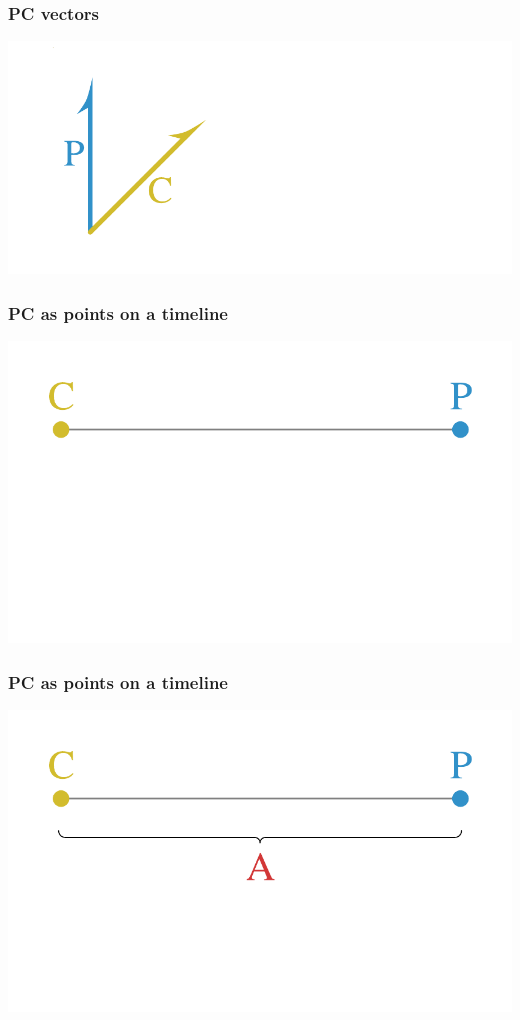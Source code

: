 \documentclass[20pt]{beamer}
\begin{document}
\begin{frame}
\frametitle{PC vectors}
\centering
\includegraphics[scale=1.5]{Figures/LexisStripped2.pdf}\\
\end{frame}

\begin{frame}
\frametitle{PC as points on a timeline}
\centering
\includegraphics[scale=1.5]{Figures/PCline0.pdf}\\
\end{frame}

\begin{frame}
\frametitle{PC as points on a timeline}
\centering
\includegraphics[scale=1.5]{Figures/PCline1.pdf}\\
\end{frame}
\end{document}
